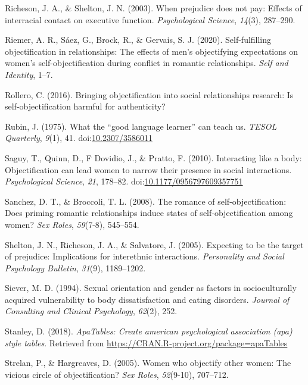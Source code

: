 \documentclass[man]{apa6}
\begin{document}
\hypertarget{ref-richeson2003prejudice}{}
Richeson, J. A., \& Shelton, J. N. (2003). When prejudice does not pay:
Effects of interracial contact on executive function.
\emph{Psychological Science}, \emph{14}(3), 287--290.

\hypertarget{ref-riemer2020self}{}
Riemer, A. R., Sáez, G., Brock, R., \& Gervais, S. J. (2020).
Self-fulfilling objectification in relationships: The effects of men's
objectifying expectations on women's self-objectification during
conflict in romantic relationships. \emph{Self and Identity}, 1--7.

\hypertarget{ref-rollero2016bringing}{}
Rollero, C. (2016). Bringing objectification into social relationships
research: Is self-objectification harmful for authenticity?

\hypertarget{ref-rubin1975}{}
Rubin, J. (1975). What the ``good language learner'' can teach us.
\emph{TESOL Quarterly}, \emph{9}(1), 41.
doi:\href{https://doi.org/10.2307/3586011}{10.2307/3586011}

\hypertarget{ref-saguyetal2010}{}
Saguy, T., Quinn, D., F Dovidio, J., \& Pratto, F. (2010). Interacting
like a body: Objectification can lead women to narrow their presence in
social interactions. \emph{Psychological Science}, \emph{21}, 178--82.
doi:\href{https://doi.org/10.1177/0956797609357751}{10.1177/0956797609357751}

\hypertarget{ref-sanchez2008romance}{}
Sanchez, D. T., \& Broccoli, T. L. (2008). The romance of
self-objectification: Does priming romantic relationships induce states
of self-objectification among women? \emph{Sex Roles}, \emph{59}(7-8),
545--554.

\hypertarget{ref-shelton2005expecting}{}
Shelton, J. N., Richeson, J. A., \& Salvatore, J. (2005). Expecting to
be the target of prejudice: Implications for interethnic interactions.
\emph{Personality and Social Psychology Bulletin}, \emph{31}(9),
1189--1202.

\hypertarget{ref-siever1994sexual}{}
Siever, M. D. (1994). Sexual orientation and gender as factors in
socioculturally acquired vulnerability to body dissatisfaction and
eating disorders. \emph{Journal of Consulting and Clinical Psychology},
\emph{62}(2), 252.

\hypertarget{ref-R-apaTables}{}
Stanley, D. (2018). \emph{ApaTables: Create american psychological
association (apa) style tables}. Retrieved from
\url{https://CRAN.R-project.org/package=apaTables}

\hypertarget{ref-strelan2005women}{}
Strelan, P., \& Hargreaves, D. (2005). Women who objectify other women:
The vicious circle of objectification? \emph{Sex Roles},
\emph{52}(9-10), 707--712.
\end{document}
